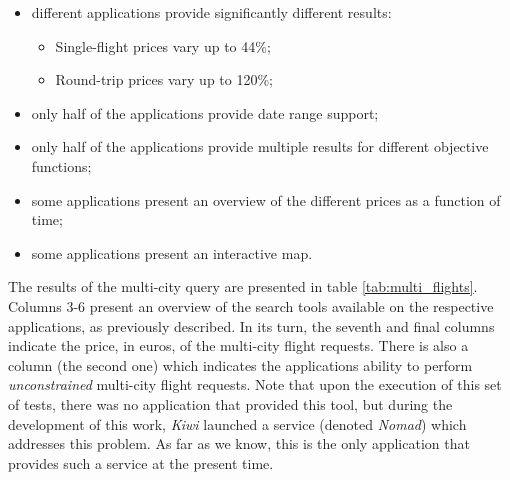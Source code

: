 \begin{itemize}[itemsep=0pt, partopsep=0pt]
  \item different applications provide significantly different results: 
    \begin{itemize}[itemsep=0pt, topsep=0pt]
        \item Single-flight prices vary up to 44\%;
        \item Round-trip prices vary up to 120\%;
    \end{itemize}
  \item only half of the applications provide date range support;
  \item only half of the applications provide multiple results for different objective functions;
  \item some applications present an overview of the different prices as a function of time;
  \item some applications present an interactive map.
\end{itemize}



The results of the multi-city query are presented in table  \ref{tab:multi_flights}. Columns 3-6 present an overview of the search tools available on the respective applications, as previously described. In its turn, the seventh and final columns indicate the price, in euros, of the multi-city flight requests. There is also a column (the second one) which indicates the applications ability to perform \textit{unconstrained} multi-city flight requests. Note that upon the execution of this set of tests, there was no application that provided this tool, but during the development of this work, \textit{Kiwi} launched a service (denoted \textit{Nomad}) which addresses this problem. As far as we know, this is the only application that provides such a service at the present time.

